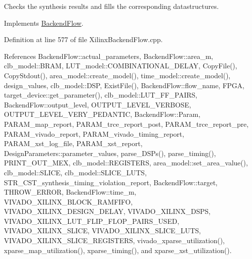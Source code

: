 Checks the synthesis results and fills the corresponding datastructures. 



Implements \hyperlink{classBackendFlow_ad2096d43b7c9c47611d719188215f23f}{Backend\+Flow}.



Definition at line 577 of file Xilinx\+Backend\+Flow.\+cpp.



References Backend\+Flow\+::actual\+\_\+parameters, Backend\+Flow\+::area\+\_\+m, clb\+\_\+model\+::\+B\+R\+AM, L\+U\+T\+\_\+model\+::\+C\+O\+M\+B\+I\+N\+A\+T\+I\+O\+N\+A\+L\+\_\+\+D\+E\+L\+AY, Copy\+File(), Copy\+Stdout(), area\+\_\+model\+::create\+\_\+model(), time\+\_\+model\+::create\+\_\+model(), design\+\_\+values, clb\+\_\+model\+::\+D\+SP, Exist\+File(), Backend\+Flow\+::flow\+\_\+name, F\+P\+GA, target\+\_\+device\+::get\+\_\+parameter(), clb\+\_\+model\+::\+L\+U\+T\+\_\+\+F\+F\+\_\+\+P\+A\+I\+RS, Backend\+Flow\+::output\+\_\+level, O\+U\+T\+P\+U\+T\+\_\+\+L\+E\+V\+E\+L\+\_\+\+V\+E\+R\+B\+O\+SE, O\+U\+T\+P\+U\+T\+\_\+\+L\+E\+V\+E\+L\+\_\+\+V\+E\+R\+Y\+\_\+\+P\+E\+D\+A\+N\+T\+IC, Backend\+Flow\+::\+Param, P\+A\+R\+A\+M\+\_\+map\+\_\+report, P\+A\+R\+A\+M\+\_\+trce\+\_\+report\+\_\+post, P\+A\+R\+A\+M\+\_\+trce\+\_\+report\+\_\+pre, P\+A\+R\+A\+M\+\_\+vivado\+\_\+report, P\+A\+R\+A\+M\+\_\+vivado\+\_\+timing\+\_\+report, P\+A\+R\+A\+M\+\_\+xst\+\_\+log\+\_\+file, P\+A\+R\+A\+M\+\_\+xst\+\_\+report, Design\+Parameters\+::parameter\+\_\+values, parse\+\_\+\+D\+S\+Ps(), parse\+\_\+timing(), P\+R\+I\+N\+T\+\_\+\+O\+U\+T\+\_\+\+M\+EX, clb\+\_\+model\+::\+R\+E\+G\+I\+S\+T\+E\+RS, area\+\_\+model\+::set\+\_\+area\+\_\+value(), clb\+\_\+model\+::\+S\+L\+I\+CE, clb\+\_\+model\+::\+S\+L\+I\+C\+E\+\_\+\+L\+U\+TS, S\+T\+R\+\_\+\+C\+S\+T\+\_\+synthesis\+\_\+timing\+\_\+violation\+\_\+report, Backend\+Flow\+::target, T\+H\+R\+O\+W\+\_\+\+E\+R\+R\+OR, Backend\+Flow\+::time\+\_\+m, V\+I\+V\+A\+D\+O\+\_\+\+X\+I\+L\+I\+N\+X\+\_\+\+B\+L\+O\+C\+K\+\_\+\+R\+A\+M\+F\+I\+FO, V\+I\+V\+A\+D\+O\+\_\+\+X\+I\+L\+I\+N\+X\+\_\+\+D\+E\+S\+I\+G\+N\+\_\+\+D\+E\+L\+AY, V\+I\+V\+A\+D\+O\+\_\+\+X\+I\+L\+I\+N\+X\+\_\+\+D\+S\+PS, V\+I\+V\+A\+D\+O\+\_\+\+X\+I\+L\+I\+N\+X\+\_\+\+L\+U\+T\+\_\+\+F\+L\+I\+P\+\_\+\+F\+L\+O\+P\+\_\+\+P\+A\+I\+R\+S\+\_\+\+U\+S\+ED, V\+I\+V\+A\+D\+O\+\_\+\+X\+I\+L\+I\+N\+X\+\_\+\+S\+L\+I\+CE, V\+I\+V\+A\+D\+O\+\_\+\+X\+I\+L\+I\+N\+X\+\_\+\+S\+L\+I\+C\+E\+\_\+\+L\+U\+TS, V\+I\+V\+A\+D\+O\+\_\+\+X\+I\+L\+I\+N\+X\+\_\+\+S\+L\+I\+C\+E\+\_\+\+R\+E\+G\+I\+S\+T\+E\+RS, vivado\+\_\+xparse\+\_\+utilization(), xparse\+\_\+map\+\_\+utilization(), xparse\+\_\+timing(), and xparse\+\_\+xst\+\_\+utilization().

